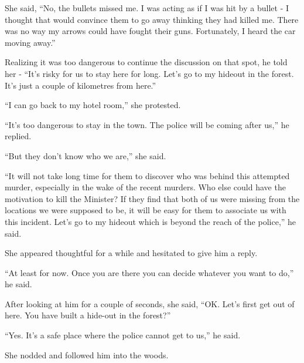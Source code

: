 She said, “No, the bullets missed me. I was acting as if I was hit by a bullet -
I thought that would convince them to go away thinking they had killed me. There
was no way my arrows could have fought their guns. Fortunately, I heard the car
moving away.”

Realizing it was too dangerous to continue the discussion on that spot, he told
her - “It's risky for us to stay here for long. Let's go to my hideout in the
forest. It's just a couple of kilometres from here.”

“I can go back to my hotel room,” she protested.

“It's too dangerous to stay in the town. The police will be coming after us,” he
replied.

“But they don't know who we are,” she said.

“It will not take long time for them to discover who was behind this attempted
murder, especially in the wake of the recent murders. Who else could have the
motivation to kill the Minister? If they find that both of us were missing from
the locations we were supposed to be, it will be easy for them to associate us
with this incident. Let's go to my hideout which is beyond the reach of the
police,” he said.

She appeared thoughtful for a while and hesitated to give him a reply.

“At least for now. Once you are there you can decide whatever you want to do,”
he said.

After looking at him for a couple of seconds, she said, “OK. Let's first get out
of here. You have built a hide-out in the forest?”

“Yes. It's a safe place where the police cannot get to us,” he said.

She nodded and followed him into the woods.